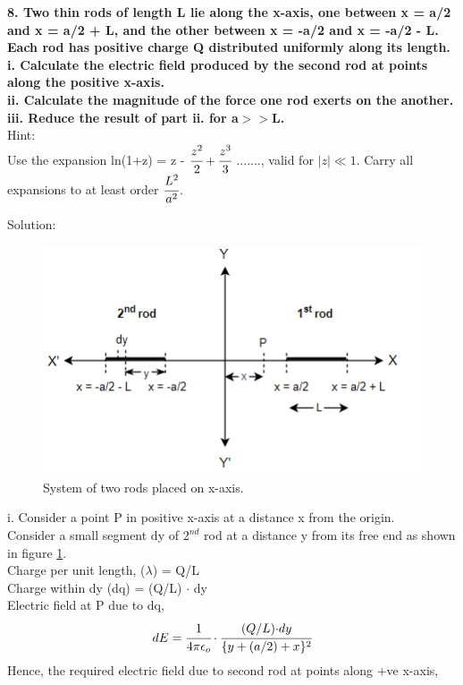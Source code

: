 \newpage
\begin{tcolorbox}
\textbf{8. Two thin rods of length L lie along the x-axis, one between x = a/2 and x = a/2 + L, and the other between x = -a/2 and x = -a/2 - L. Each rod has positive charge Q distributed uniformly along its length.\\
i. Calculate the electric field produced by the second rod at points along the positive x-axis.\\
ii. Calculate the magnitude of the force one rod exerts on the another.\\
iii. Reduce the result of part ii. for a$>>$L.\\}
Hint:\\
Use the expansion ln(1+z) = z - $\cfrac{z^2}{2} + \cfrac{z^3}{3}$ ......., valid for $\mid z\mid \ll1$. Carry all expansions to at least order $\cfrac{L^2}{a^2}$.
\end{tcolorbox}
Solution:\\
\begin{figure}[h]
    \centering
    \includegraphics[scale = 0.75]{figures/Sandesh's Figures/2rd1.png}
    \caption{System of two rods placed on x-axis.}
    \label{2rd1}
\end{figure}
i. Consider a point P in positive x-axis at a distance x from the origin.\\
Consider a small segment dy of $2^{nd}$ rod at a distance y from its free end as shown in figure \ref{2rd1}.\\
Charge per unit length, ($\lambda$) = Q/L
\vspace{3pt}
\\
Charge within dy (dq) = (Q/L) $\cdot$ dy 
\vspace{3pt}
\\
Electric field at P due to dq, \[dE = \cfrac{1}{4 \pi \epsilon_o} \cdot \cfrac{{(Q/L)\cdot}dy}{\{y+ (a/2) + x\}^2}\]
Hence, the required electric field due to second rod at points along +ve x-axis,

